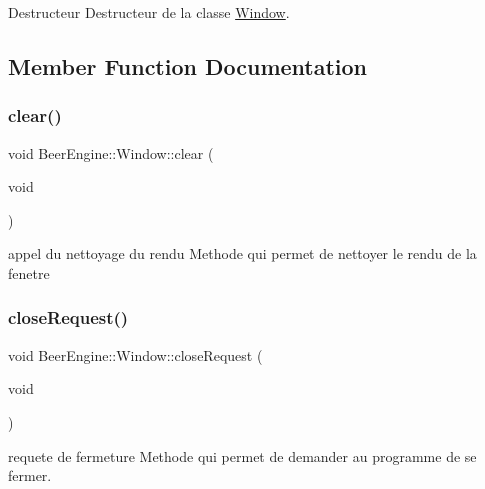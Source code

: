 Destructeur Destructeur de la classe \mbox{\hyperlink{class_beer_engine_1_1_window}{Window}}. 



\subsection{Member Function Documentation}
\mbox{\label{class_beer_engine_1_1_window_a7417b4c023c22a9641a1b94cd0cfee93}} 
\subsubsection{\texorpdfstring{clear()}{clear()}}
{\footnotesize\ttfamily void Beer\+Engine\+::\+Window\+::clear (\begin{DoxyParamCaption}\item[{void}]{ }\end{DoxyParamCaption})}



appel du nettoyage du rendu Methode qui permet de nettoyer le rendu de la fenetre 

\mbox{\label{class_beer_engine_1_1_window_a0ff67069f460adb018b1050da62d8a54}} 
\subsubsection{\texorpdfstring{close\+Request()}{closeRequest()}}
{\footnotesize\ttfamily void Beer\+Engine\+::\+Window\+::close\+Request (\begin{DoxyParamCaption}\item[{void}]{ }\end{DoxyParamCaption})}



requete de fermeture Methode qui permet de demander au programme de se fermer. 

\mbox{\label{class_beer_engine_1_1_window_a630b8f5eca39a184818b876b1eb0374d}} 

